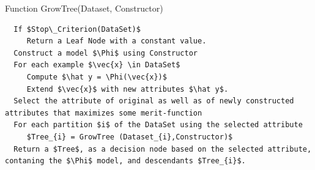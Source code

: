 \lstset{style=customAlg}
\begin{algorithm}
	\caption{Function GrowTree(Dataset, Constructor)}
	\begin{lstlisting}
  If $Stop\_Criterion(DataSet)$
     Return a Leaf Node with a constant value.
  Construct a model $\Phi$ using Constructor
  For each example $\vec{x} \in DataSet$
     Compute $\hat y = \Phi(\vec{x})$
     Extend $\vec{x}$ with new attributes $\hat y$.
  Select the attribute of original as well as of newly constructed attributes that maximizes some merit-function
  For each partition $i$ of the DataSet using the selected attribute
     $Tree_{i} = GrowTree (Dataset_{i},Constructor)$
  Return a $Tree$, as a decision node based on the selected attribute, contaning the $\Phi$ model, and descendants $Tree_{i}$.
	\end{lstlisting}
\end{algorithm}

